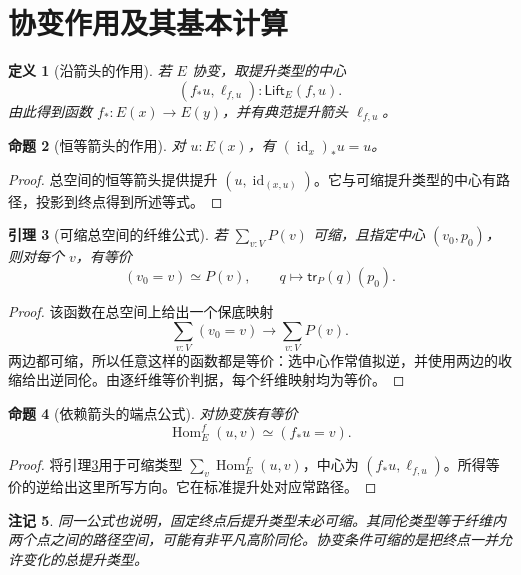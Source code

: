 \documentclass[12pt,oneside,openany,fontset=none]{ctexbook}
\theoremstyle{cn}
\newtheorem{definition}{定义}[chapter]
\newtheorem{lemma}[definition]{引理}
\newtheorem{proposition}[definition]{命题}
\newtheorem{remark}[definition]{注记}
\numberwithin{equation}{chapter}
\newcommand{\id}{\operatorname{id}}
\newcommand{\Hom}{\operatorname{Hom}}
\newcommand{\tr}{\mathsf{tr}}
\begin{document}
\section{协变作用及其基本计算}
\begin{definition}[沿箭头的作用]
若 $E$ 协变，取提升类型的中心
\[
(f_*u,\ell_{f,u}):\mathsf{Lift}_E(f,u).
\]
由此得到函数 $f_*:E(x)\to E(y)$，并有典范提升箭头 $\ell_{f,u}$。
\end{definition}
\begin{proposition}[恒等箭头的作用]
对 $u:E(x)$，有 $(\id_x)_*u=u$。
\end{proposition}
\begin{proof}
总空间的恒等箭头提供提升 $(u,\id_{(x,u)})$。它与可缩提升类型的中心有路径，投影到终点得到所述等式。
\end{proof}
\begin{lemma}[可缩总空间的纤维公式]\label{lem:singleton-fiber}
若 $\sum_{v:V}P(v)$ 可缩，且指定中心 $(v_0,p_0)$，则对每个 $v$，有等价
\[
(v_0=v)\simeq P(v),
\qquad q\longmapsto\tr_P(q)(p_0).
\]
\end{lemma}
\begin{proof}
该函数在总空间上给出一个保底映射
\[
\sum_{v:V}(v_0=v)\longrightarrow\sum_{v:V}P(v).
\]
两边都可缩，所以任意这样的函数都是等价：选中心作常值拟逆，并使用两边的收缩给出逆同伦。由逐纤维等价判据，每个纤维映射均为等价。
\end{proof}
\begin{proposition}[依赖箭头的端点公式]\label{prop:dependent-arrow}
对协变族有等价
\[
\Hom_E^f(u,v)\simeq(f_*u=v).
\]
\end{proposition}
\begin{proof}
将引理\ref{lem:singleton-fiber}用于可缩类型
$\sum_v\Hom_E^f(u,v)$，中心为 $(f_*u,\ell_{f,u})$。所得等价的逆给出这里所写方向。它在标准提升处对应常路径。
\end{proof}
\begin{remark}
同一公式也说明，固定终点后提升类型未必可缩。其同伦类型等于纤维内两个点之间的路径空间，可能有非平凡高阶同伦。协变条件可缩的是把终点一并允许变化的总提升类型。
\end{remark}
\end{document}
